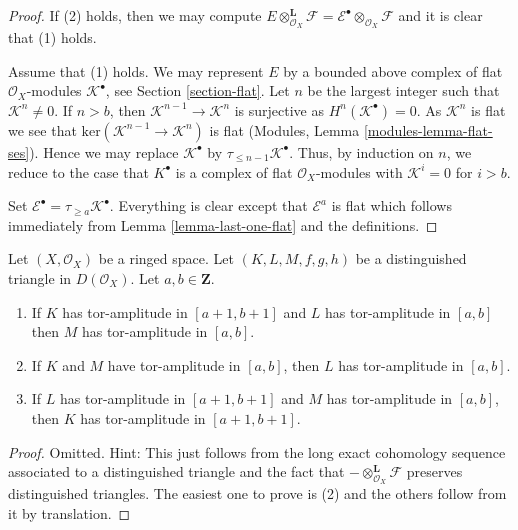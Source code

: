 \begin{proof}
If (2) holds, then we may compute
$E \otimes_{\mathcal{O}_X}^\mathbf{L} \mathcal{F} =
\mathcal{E}^\bullet \otimes_{\mathcal{O}_X} \mathcal{F}$
and it is clear that (1) holds.

\medskip\noindent
Assume that (1) holds. We may represent $E$ by a bounded above complex
of flat $\mathcal{O}_X$-modules $\mathcal{K}^\bullet$, see
Section \ref{section-flat}.
Let $n$ be the largest integer such that $\mathcal{K}^n \not = 0$.
If $n > b$, then $\mathcal{K}^{n - 1} \to \mathcal{K}^n$ is surjective as
$H^n(\mathcal{K}^\bullet) = 0$. As $\mathcal{K}^n$ is flat we see that
$\text{ker}(\mathcal{K}^{n - 1} \to \mathcal{K}^n)$ is flat
(Modules, Lemma \ref{modules-lemma-flat-ses}).
Hence we may replace $\mathcal{K}^\bullet$ by
$\tau_{\leq n - 1}\mathcal{K}^\bullet$. Thus, by induction on $n$, we
reduce to the case that $K^\bullet$ is a complex of flat
$\mathcal{O}_X$-modules with $\mathcal{K}^i = 0$ for $i > b$.

\medskip\noindent
Set $\mathcal{E}^\bullet = \tau_{\geq a}\mathcal{K}^\bullet$.
Everything is clear except that $\mathcal{E}^a$ is flat
which follows immediately from Lemma \ref{lemma-last-one-flat}
and the definitions.
\end{proof}

\begin{lemma}
\label{lemma-cone-tor-amplitude}
Let $(X, \mathcal{O}_X)$ be a ringed space.
Let $(K, L, M, f, g, h)$ be a distinguished
triangle in $D(\mathcal{O}_X)$. Let $a, b \in \mathbf{Z}$.
\begin{enumerate}
\item If $K$ has tor-amplitude in $[a + 1, b + 1]$ and
$L$ has tor-amplitude in $[a, b]$ then $M$ has
tor-amplitude in $[a, b]$.
\item If $K$ and $M$ have tor-amplitude in $[a, b]$, then
$L$ has tor-amplitude in $[a, b]$.
\item If $L$ has tor-amplitude in $[a + 1, b + 1]$
and $M$ has tor-amplitude in $[a, b]$, then
$K$ has tor-amplitude in $[a + 1, b + 1]$.
\end{enumerate}
\end{lemma}

\begin{proof}
Omitted. Hint: This just follows from the long exact cohomology sequence
associated to a distinguished triangle and the fact that
$- \otimes_{\mathcal{O}_X}^{\mathbf{L}} \mathcal{F}$
preserves distinguished triangles.
The easiest one to prove is (2) and the others follow from it by
translation.
\end{proof}

